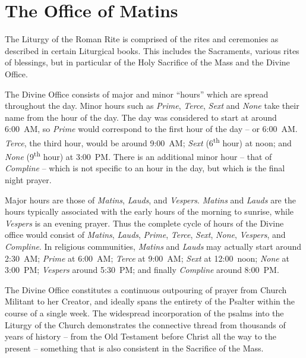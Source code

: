 \documentclass[letterpaper,12pt]{book} %
\begin{document}
\normalsize
{}


\vspace*{5in}
\thispagestyle{empty}
\pagebreak

\chapter{The Office of Matins}

{
	\def\matins{\emph{Matins}}
	\def\lauds{\emph{Lauds}}
	\def\vespers{\emph{Vespers}}
	\def\compline{\emph{Compline}}
	\def\prime{\emph{Prime}}
	\def\terce{\emph{Terce}}
	\def\sext{\emph{Sext}}
	\def\none{\emph{None}}
	\def\th{\textsuperscript{th}}
	\def\rd{\textsuperscript{rd}}
	\setlength{\parindent}{0cm}
	\setlength{\parskip}{\baselineskip}
	The Liturgy of the Roman Rite is comprised of the rites and ceremonies as described in certain Liturgical books. This
	includes the Sacraments, various rites of blessings, but in particular of the Holy Sacrifice of the Mass and the Divine Office.

	The Divine Office consists of major and minor ``hours'' which are spread throughout the day. Minor hours such as \prime,
	\terce{}, \sext{} and \none{} take their name from the hour of the day. The day was considered to start at around 6:00~AM, so
	\prime{} would correspond to the first hour of the day – or 6:00~AM. \terce{}, the third hour, would be around 9:00~AM; \sext{}
	(6\th{} hour) at noon; and \none{} (9\th{} hour) at 3:00~PM. There is an additional minor hour – that of \compline{} – which is not
	specific to an hour in the day, but which is the final night prayer.

	Major hours are those of \matins{}, \lauds{}, and \vespers{}. \matins{} and \lauds{} are the hours typically associated with the early
	hours of the morning to sunrise, while \vespers{} is an evening prayer. Thus the complete cycle of hours of the Divine office would
	consist of \matins{}, \lauds{}, \prime{}, \terce{}, \sext{}, \none{}, \vespers{}, and \compline{}. In religious communities, \matins{} and \lauds{}
	may actually start around 2:30~AM; \prime{} at 6:00~AM; \terce{} at 9:00~AM; \sext{} at 12:00~noon; \none{} at 3:00~PM; \vespers{}
	around 5:30~PM; and finally \compline{} around 8:00~PM.

	The Divine Office constitutes a continuous outpouring of prayer from Church Militant to her Creator, and ideally spans the
	entirety of the Psalter within the course of a single week. The widespread incorporation of the psalms into the Liturgy of
	the Church demonstrates the connective thread from thousands of years of history – from the Old Testament before Christ
	all the way to the present – something that is also consistent in the Sacrifice of the Mass.

}
\end{document}
